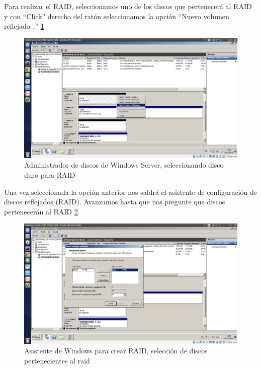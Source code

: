 Para realizar el RAID, seleccionamos uno de los discos que pertenecerá al RAID y con ``Click'' derecho del ratón
seleccionamos la opción ``Nuevo volumen reflejado...'' \ref{fig:P1_E13_3}

\begin{figure}[H] %
\centering
\includegraphics[scale=0.3]{img/P1-Ejercicio13-3.png} 
\caption{Administrador de discos de Windows Server, seleccionando disco duro para RAID} \label{fig:P1_E13_3}
\end{figure}

Una vez seleccionada la opción anterior nos saldrá el asistente de configuración de discos reflejados (RAID).
Avanzamos hasta que nos pregunte que discos pertenecerán al RAID \ref{fig:P1_E13_4}.

\begin{figure}[H] %
\centering
\includegraphics[scale=0.3]{img/P1-Ejercicio13-4.png} 
\caption{Asistente de Windows para crear RAID, selección de discos pertenecientes al raid} \label{fig:P1_E13_4}
\end{figure}

